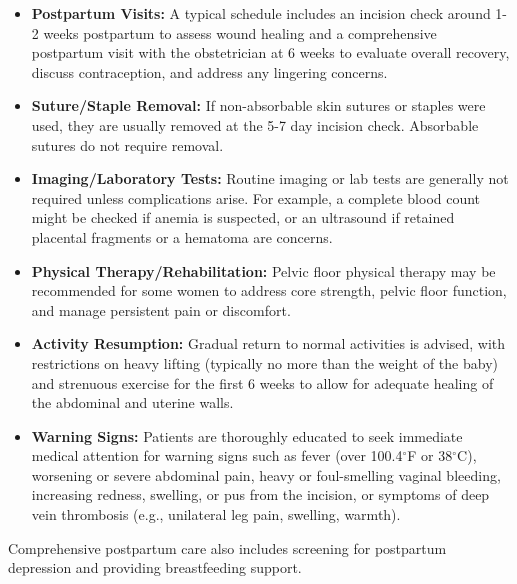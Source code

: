 \begin{itemize}
  \item \textbf{Postpartum Visits:} A typical schedule includes an incision check around 1-2 weeks postpartum to assess wound healing and a comprehensive postpartum visit with the obstetrician at 6 weeks to evaluate overall recovery, discuss contraception, and address any lingering concerns.
  \item \textbf{Suture/Staple Removal:} If non-absorbable skin sutures or staples were used, they are usually removed at the 5-7 day incision check. Absorbable sutures do not require removal.
  \item \textbf{Imaging/Laboratory Tests:} Routine imaging or lab tests are generally not required unless complications arise. For example, a complete blood count might be checked if anemia is suspected, or an ultrasound if retained placental fragments or a hematoma are concerns.
  \item \textbf{Physical Therapy/Rehabilitation:} Pelvic floor physical therapy may be recommended for some women to address core strength, pelvic floor function, and manage persistent pain or discomfort.
  \item \textbf{Activity Resumption:} Gradual return to normal activities is advised, with restrictions on heavy lifting (typically no more than the weight of the baby) and strenuous exercise for the first 6 weeks to allow for adequate healing of the abdominal and uterine walls.
  \item \textbf{Warning Signs:} Patients are thoroughly educated to seek immediate medical attention for warning signs such as fever (over 100.4$^{\circ}$F or 38$^{\circ}$C), worsening or severe abdominal pain, heavy or foul-smelling vaginal bleeding, increasing redness, swelling, or pus from the incision, or symptoms of deep vein thrombosis (e.g., unilateral leg pain, swelling, warmth).
\end{itemize}
Comprehensive postpartum care also includes screening for postpartum depression and providing breastfeeding support.

